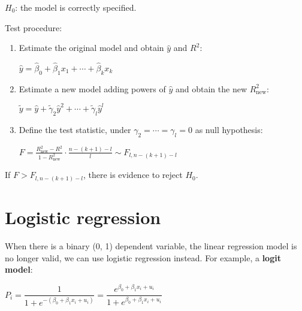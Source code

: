 \documentclass[10pt, a4paper, landscape]{article}
\begin{document}
\begin{multicols}{3}
		\begin{center}
			$H_{0}$: the model is correctly specified.
		\end{center}
		
		Test procedure:
		
		\begin{enumerate}[leftmargin=*]
			\item Estimate the original model and obtain $\hat{y}$ and $R^{2}$:
			
			\begin{center}
				$\hat{y} = \hat{\beta}_{0} + \hat{\beta}_{1} x_{1} + \cdots + \hat{\beta}_{k} x_{k}$
			\end{center}
			
			\item Estimate a new model adding powers of $\hat{y}$ and obtain the new $R^{2}_{\mathrm{new}}$:
			
			\begin{center}
				$\tilde{y} = \hat{y} + \tilde{\gamma}_{2} \hat{y}^{2} + \cdots + \tilde{\gamma}_{l} \hat{y}^{l}$
			\end{center}
			
			\item Define the test statistic, under $\gamma_{2} = \cdots = \gamma_{l} = 0$ as null hypothesis:
			
			\begin{center}
				$F = \frac{R^{2}_{\mathrm{new}} - R^{2}}{1 - R^{2}_{\mathrm{new}}} \cdot \frac{n - (k + 1) - l}{l} \sim F_{l, n - (k + 1) - l}$
			\end{center}
		\end{enumerate}
		
		If $F > F_{l, n - (k + 1) - l}$, there is evidence to reject $H_{0}$.
		
		\section*{Logistic regression}
		
		When there is a binary (0, 1) dependent variable, the linear regression model is no longer valid, we can use logistic regression instead. For example, a \textbf{logit model}:
		
		\begin{center}
			$P_{i} = \dfrac{1}{1 + e^{-(\beta_{0} + \beta_{1} x_{i} + u_{i})}}= \dfrac{e^{\beta_{0} + \beta_{1} x_{i} + u_{i}}}{1 + e^{\beta_{0} + \beta_{1} x_{i} + u_{i}}}$
		\end{center}
		

\end{multicols}
\end{document}
